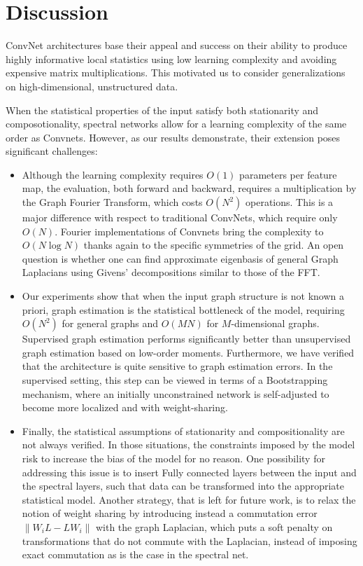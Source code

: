 \documentclass{article} %
\begin{document}
\section{Discussion}

ConvNet architectures base their appeal and success on their 
ability to produce highly informative local statistics using low learning complexity
and avoiding expensive matrix multiplications. This motivated us to 
consider generalizations on high-dimensional, unstructured data.

When the statistical properties of the input satisfy both stationarity 
and composotionality, spectral networks allow for a learning complexity 
of the same order as Convnets. However, as our results demonstrate, 
their extension poses significant challenges:
\begin{itemize}
\item Although the learning complexity requires $O(1)$ parameters per feature map, 
the evaluation, both forward and backward, requires a multiplication by the Graph Fourier Transform, 
which costs $O(N^2)$ operations. This is a major difference with respect to traditional ConvNets, which 
require only $O(N)$. Fourier implementations of Convnets \cite{mathieu2013fast, DBLP:journals/corr/VasilacheJMCPL14} bring the complexity to $O(N \log N)$ 
thanks again to the specific symmetries of the grid. An open question is whether one can find approximate eigenbasis
of general Graph Laplacians using Givens' decompositions similar to those of the FFT. 

\item Our experiments show that when the input graph structure is not known a priori, graph estimation is
the statistical bottleneck of the model, requiring $O(N^2)$ for general graphs and $O(M N)$ for $M$-dimensional graphs.
Supervised graph estimation performs significantly better than unsupervised graph estimation based on low-order moments. Furthermore, we have verified that
the architecture is quite sensitive to graph estimation errors. In the supervised setting, this step can be viewed in terms of
a Bootstrapping mechanism, where an initially unconstrained network is self-adjusted to become more localized and with weight-sharing. 

\item Finally, the statistical assumptions of stationarity and compositionality are not always verified. In those situations, the constraints
imposed by the model risk to increase the bias of the model for no reason. One possibility for addressing this issue is to insert Fully connected 
layers between the input and the spectral layers, such that data can be transformed into the appropriate statistical model. Another strategy, that is
left for future work, is to relax the notion of weight sharing by introducing instead a commutation error $\| W_i L - L W_i \|$ with the graph Laplacian, 
which puts a soft penalty on transformations that do not commute with the Laplacian, instead of imposing exact commutation as is the case in the spectral net. 

\end{itemize}


{}

\end{document}
